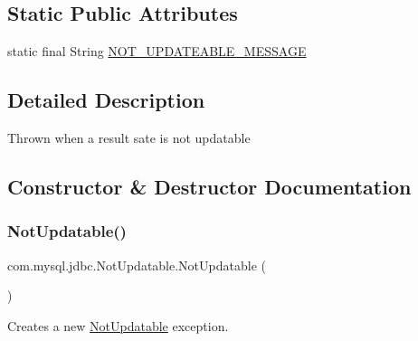 \subsection*{Static Public Attributes}
\begin{DoxyCompactItemize}
\item 
static final String \mbox{\hyperlink{classcom_1_1mysql_1_1jdbc_1_1_not_updatable_ae7cbbc4b3401967b180760f8dc00edc8}{N\+O\+T\+\_\+\+U\+P\+D\+A\+T\+E\+A\+B\+L\+E\+\_\+\+M\+E\+S\+S\+A\+GE}}
\end{DoxyCompactItemize}


\subsection{Detailed Description}
Thrown when a result sate is not updatable 

\subsection{Constructor \& Destructor Documentation}
\mbox{\label{classcom_1_1mysql_1_1jdbc_1_1_not_updatable_a7cf7d4691571ffeb2cff816f8eb450ca}} 
\subsubsection{\texorpdfstring{Not\+Updatable()}{NotUpdatable()}\hspace{0.1cm}{\footnotesize\ttfamily [1/2]}}
{\footnotesize\ttfamily com.\+mysql.\+jdbc.\+Not\+Updatable.\+Not\+Updatable (\begin{DoxyParamCaption}{ }\end{DoxyParamCaption})}

Creates a new \mbox{\hyperlink{classcom_1_1mysql_1_1jdbc_1_1_not_updatable}{Not\+Updatable}} exception. \mbox{\label{classcom_1_1mysql_1_1jdbc_1_1_not_updatable_a11df678de184699dbb1be7c6cddad461}} 
